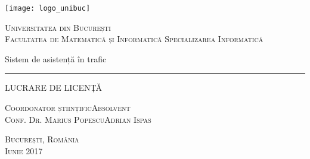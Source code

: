 \begin{titlepage}
	\begin{center}

		\texttt{[image: logo\_unibuc]}

		\vspace{0.5cm}
		\LARGE \textsc{Universitatea din București}
		\\
		\vspace{0.5cm}
		\Large \textsc{Facultatea de Matematică și Informatică}
		\vspace{0.5cm}
		\Large \textsc{Specializarea Informatică}

		\vfill

		\Huge Sistem de asistență în trafic
		\rule{\textwidth}{1pt}
		\Large LUCRARE DE LICENȚĂ

		\vfill

		\Large
		\textsc{Coordonator științific}\hfill \textsc{Absolvent}
		\\
		\large
		\textsc{Conf. Dr. Marius Popescu}\hfill \textsc{Adrian Ispas}
	
		\vspace{1.5cm}
		\textsc{București, România}\\
		\textsc{Iunie 2017}

	\end{center}
\end{titlepage}
 
